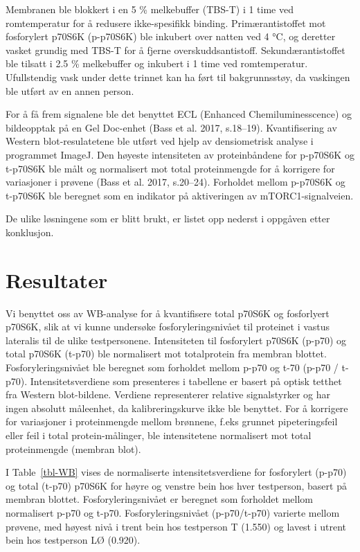 \documentclass[
  letterpaper,
  DIV=11,
  numbers=noendperiod]{scrreprt}
\begin{document}
Membranen ble blokkert i en 5 \% melkebuffer (TBS-T) i 1 time ved
romtemperatur for å redusere ikke-spesifikk binding. Primærantistoffet
mot fosforylert p70S6K (p-p70S6K) ble inkubert over natten ved 4 °C, og
deretter vasket grundig med TBS-T for å fjerne overskuddsantistoff.
Sekundærantistoffet ble tilsatt i 2.5 \% melkebuffer og inkubert i 1
time ved romtemperatur. Ufullstendig vask under dette trinnet kan ha
ført til bakgrunnsstøy, da vaskingen ble utført av en annen person.

For å få frem signalene ble det benyttet ECL (Enhanced
Chemiluminesscence) og bildeopptak på en Gel Doc-enhet (Bass et al.
2017, s.18--19). Kvantifisering av Western blot-resulatetene ble utført
ved hjelp av densiometrisk analyse i programmet ImageJ. Den høyeste
intensiteten av proteinbåndene for p-p70S6K og t-p70S6K ble målt og
normalisert mot total proteinmengde for å korrigere for variasjoner i
prøvene (Bass et al. 2017, s.20--24). Forholdet mellom p-p70S6K og
t-p70S6K ble beregnet som en indikator på aktiveringen av
mTORC1-signalveien.

De ulike løsningene som er blitt brukt, er listet opp nederst i oppgåven
etter konklusjon.

\section{Resultater}\label{resultater-2}

Vi benyttet oss av WB-analyse for å kvantifisere total p70S6K og
fosforlyert p70S6K, slik at vi kunne undersøke fosforyleringsnivået til
proteinet i vastus lateralis til de ulike testpersonene. Intensiteten
til fosforylert p70S6K (p-p70) og total p70S6K (t-p70) ble normalisert
mot totalprotein fra membran blottet. Fosforyleringsnivået ble beregnet
som forholdet mellom p-p70 og t-70 (p-p70 / t-p70). Intensitetsverdiene
som presenteres i tabellene er basert på optisk tetthet fra Western
blot-bildene. Verdiene representerer relative signalstyrker og har ingen
absolutt måleenhet, da kalibreringskurve ikke ble benyttet. For å
korrigere for variasjoner i proteinmengde mellom brønnene, f.eks grunnet
pipeteringsfeil eller feil i total protein-målinger, ble intensitetene
normalisert mot total proteinmengde (membran blot).

I Table~\ref{tbl-WB} vises de normaliserte intensitetsverdiene for
fosforylert (p-p70) og total (t-p70) p70S6K for høyre og venstre bein
hos hver testperson, basert på membran blottet. Fosforyleringsnivået er
beregnet som forholdet mellom normalisert p-p70 og t-p70.
Fosforyleringsnivået (p-p70/t-p70) varierte mellom prøvene, med høyest
nivå i trent bein hos testperson T (1.550) og lavest i utrent bein hos
testperson LØ (0.920).
\end{document}
